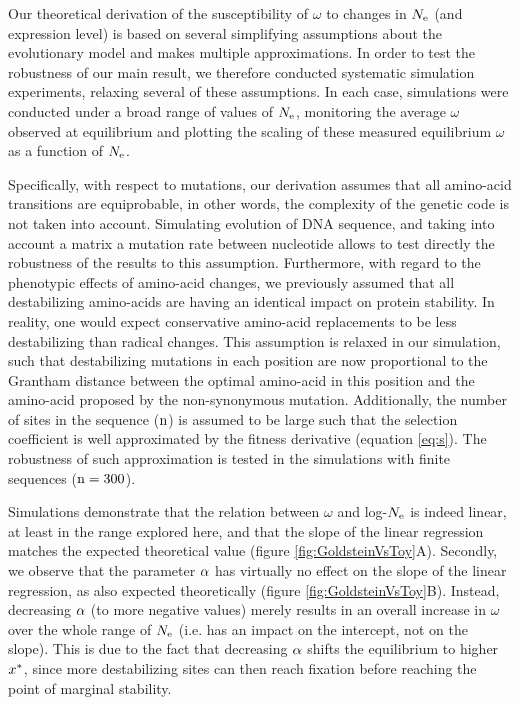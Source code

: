 Our theoretical derivation of the susceptibility of $\omega$ to changes in $N_{\mathrm{e}}$ (and expression level) is based on several simplifying assumptions about the evolutionary model and makes multiple approximations.
In order to test the robustness of our main result, we therefore conducted systematic simulation experiments, relaxing several of these assumptions.
In each case, simulations were conducted under a broad range of values of $N_{\mathrm{e}}$, monitoring the average $\omega$ observed at equilibrium and plotting the scaling of these measured equilibrium $\omega$ as a function of $N_{\mathrm{e}}$. 

Specifically, with respect to mutations, our derivation assumes that all amino-acid transitions are equiprobable, in other words, the complexity of the genetic code is not taken into account.
Simulating evolution of DNA sequence, and taking into account a matrix a mutation rate between nucleotide allows to test directly the robustness of the results to this assumption.
Furthermore, with regard to the phenotypic effects of amino-acid changes, we previously assumed that all destabilizing amino-acids are having an identical impact on protein stability.
In reality, one would expect conservative amino-acid replacements to be less destabilizing than radical changes.
This assumption is relaxed in our simulation, such that destabilizing mutations in each position are now proportional to the Grantham distance \citep{Grantham1974} between the optimal amino-acid in this position and the amino-acid proposed by the non-synonymous mutation.
Additionally, the number of sites in the sequence ($\text{n}$) is assumed to be large such that the selection coefficient is well approximated by the fitness derivative (equation \ref{eq:s}).
The robustness of such approximation is tested in the simulations with finite sequences ($\text{n}=300$).

Simulations demonstrate that the relation between $\omega$ and log-$N_{\mathrm{e}}$ is indeed linear, at least in the range explored here, and that the slope of the linear regression matches the expected theoretical value (figure \ref{fig:GoldsteinVsToy}A).
Secondly, we observe that the parameter $\alpha$ has virtually no effect on the slope of the linear regression, as also expected theoretically (figure \ref{fig:GoldsteinVsToy}B). Instead, decreasing $\alpha$ (to more negative values) merely results in an overall increase in $\omega$ over the whole range of $N_{\mathrm{e}}$ (i.e. has an impact on the intercept, not on the slope). This is due to the fact that decreasing $\alpha$ shifts the equilibrium to higher $x^{*}$, since more destabilizing sites can then reach fixation before reaching the point of marginal stability.


